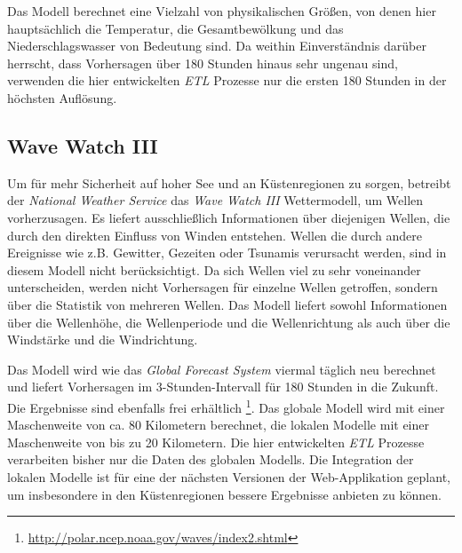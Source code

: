 Das Modell berechnet eine Vielzahl von physikalischen Größen, von
denen hier hauptsächlich die Temperatur, die Gesamtbewölkung und das
Niederschlagswasser von Bedeutung sind. Da weithin Einverständnis
darüber herrscht, dass Vorhersagen über 180 Stunden hinaus sehr
ungenau sind, verwenden die hier entwickelten \textit{ETL} Prozesse
nur die ersten 180 Stunden in der höchsten Auflösung.

\subsection{Wave Watch III}

Um für mehr Sicherheit auf hoher See und an Küstenregionen zu sorgen,
betreibt der \textit{National Weather Service} das \textit{Wave Watch
  III} Wettermodell, um Wellen vorherzusagen. Es liefert
ausschließlich Informationen über diejenigen Wellen, die durch den
direkten Einfluss von Winden entstehen. Wellen die durch andere
Ereignisse wie z.B. Gewitter, Gezeiten oder Tsunamis verursacht
werden, sind in diesem Modell nicht berücksichtigt. Da sich Wellen
viel zu sehr voneinander unterscheiden, werden nicht Vorhersagen für
einzelne Wellen getroffen, sondern über die Statistik von mehreren
Wellen. Das Modell liefert sowohl Informationen über die Wellenhöhe,
die Wellenperiode und die Wellenrichtung als auch über die Windstärke
und die Windrichtung.

Das Modell wird wie das \textit{Global Forecast System} viermal
täglich neu berechnet und liefert Vorhersagen im 3-Stunden-Intervall
für 180 Stunden in die Zukunft. Die Ergebnisse sind ebenfalls frei
erhältlich
\footnote{\url{http://polar.ncep.noaa.gov/waves/index2.shtml}}. Das
globale Modell wird mit einer Maschenweite von ca. 80 Kilometern
berechnet, die lokalen Modelle mit einer Maschenweite von bis zu 20
Kilometern. Die hier entwickelten \textit{ETL} Prozesse verarbeiten
bisher nur die Daten des globalen Modells. Die Integration der lokalen
Modelle ist für eine der nächsten Versionen der Web-Applikation
geplant, um insbesondere in den Küstenregionen bessere Ergebnisse
anbieten zu können.


